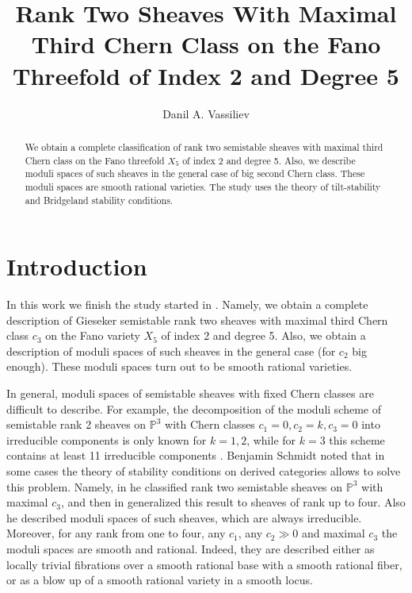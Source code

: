 \documentclass{amsart}
\title[Rank Two Sheaves With Maximal Third Chern Class on Fano 3-fold $X_5$]{Rank Two Sheaves With Maximal Third Chern Class on the Fano Threefold of Index 2 and Degree 5}
\author{Danil A. Vassiliev}
\begin{document}
	\maketitle
	\begin{abstract}
	We obtain a complete classification of rank two semistable sheaves with maximal third Chern class on the Fano threefold $X_5$ of index 2 and degree 5. Also, we describe moduli spaces of such sheaves in the general case of big second Chern class. These moduli spaces are smooth rational varieties. The study uses the theory of tilt-stability and Bridgeland stability conditions.
	\end{abstract}
	
	\section{Introduction}	
	In this work we finish the study started in \cite{Vass}. Namely, we obtain a complete description of Gieseker semistable rank two sheaves with maximal third Chern class $c_3$ on the Fano variety $X_5$ of index 2 and degree 5. Also, we obtain a description of moduli spaces of such sheaves in the general case (for $c_2$ big enough). These moduli spaces turn out to be smooth rational varieties.
	
	In general, moduli spaces of semistable sheaves with fixed Chern classes are difficult to describe. For example, the decomposition of the moduli scheme of semistable rank 2 sheaves on $\mathbb P^3$ with Chern classes $c_1=0,c_2=k,c_3=0$ into irreducible components is only known for $k=1, 2$, while for $k=3$ this scheme contains at least 11 irreducible components \cite[abstract]{Lavrov}. Benjamin Schmidt noted that in some cases the theory of stability conditions on derived categories allows to solve this problem. Namely, in \cite{Sch18} he classified rank two semistable sheaves on $\mathbb P^3$ with maximal $c_3$, and then in \cite{Sch23} generalized this result to sheaves of rank up to four. Also he described moduli spaces of such sheaves, which are always irreducible. Moreover, for any rank from one to four, any $c_1$, any $c_2\gg 0$ and maximal $c_3$ the moduli spaces are smooth and rational. Indeed, they are described either as locally trivial fibrations over a smooth rational base with a smooth rational fiber, or as a blow up of a smooth rational variety in a smooth locus.
	
\end{document}
